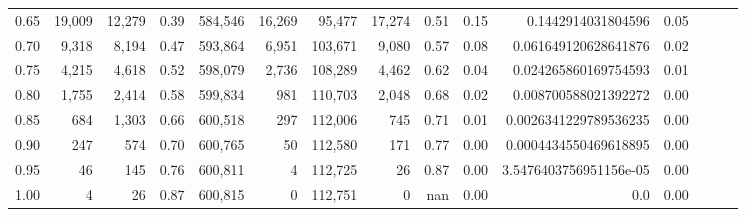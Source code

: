 \begin{tabular}{rrrrrrrrrrrrrrr}
0.65 &   19,009 &  12,279 &  0.39 &  584,546 &   16,269 &   95,477 &   17,274 &  0.51 &  0.15 &      0.1442914031804596 &      0.05 \\
0.70 &    9,318 &   8,194 &  0.47 &  593,864 &    6,951 &  103,671 &    9,080 &  0.57 &  0.08 &    0.061649120628641876 &      0.02 \\
0.75 &    4,215 &   4,618 &  0.52 &  598,079 &    2,736 &  108,289 &    4,462 &  0.62 &  0.04 &    0.024265860169754593 &      0.01 \\
0.80 &    1,755 &   2,414 &  0.58 &  599,834 &      981 &  110,703 &    2,048 &  0.68 &  0.02 &    0.008700588021392272 &      0.00 \\
0.85 &      684 &   1,303 &  0.66 &  600,518 &      297 &  112,006 &      745 &  0.71 &  0.01 &   0.0026341229789536235 &      0.00 \\
0.90 &      247 &     574 &  0.70 &  600,765 &       50 &  112,580 &      171 &  0.77 &  0.00 &   0.0004434550469618895 &      0.00 \\
0.95 &       46 &     145 &  0.76 &  600,811 &        4 &  112,725 &       26 &  0.87 &  0.00 &  3.5476403756951156e-05 &      0.00 \\
1.00 &        4 &      26 &  0.87 &  600,815 &        0 &  112,751 &        0 &   nan &  0.00 &                     0.0 &      0.00 \\
\bottomrule
\end{tabular}
